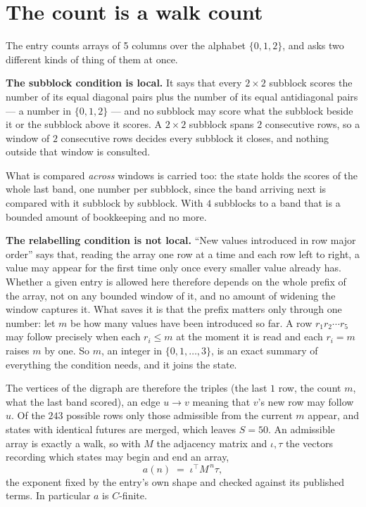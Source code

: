 \documentclass[11pt,a4paper]{article}
\theoremstyle{plain}
\theoremstyle{definition}
\begin{document}
\section{The count is a walk count}

The entry counts arrays of 5 columns over the alphabet $\{0,1,2\}$, and asks two different kinds of thing of them at once.

\textbf{The subblock condition is local.} It says that every $2\times2$ subblock scores the number of its equal diagonal pairs plus the number of its equal antidiagonal pairs --- a number in $\{0,1,2\}$ --- and no subblock may score what the subblock beside it or the subblock above it scores. A $ 2\times2$ subblock spans $2$ consecutive rows, so a window of $2$ consecutive rows decides every subblock it closes, and nothing outside that window is consulted.

What is compared \emph{across} windows is carried too: the state holds the scores of the whole last band, one number per subblock, since the band arriving next is compared with it subblock by subblock. With $4$ subblocks to a band that is a bounded amount of bookkeeping and no more.

\textbf{The relabelling condition is not local.} ``New values introduced in row major order'' says that, reading the array one row at a time and each row left to right, a value may appear for the first time only once every smaller value already has. Whether a given entry is allowed here therefore depends on the whole prefix of the array, not on any bounded window of it, and no amount of widening the window captures it. What saves it is that the prefix matters only through one number: let $m$ be how many values have been introduced so far. A row $r_1r_2\cdots r_5$ may follow precisely when each $r_i\le m$ at the moment it is read and each $r_i=m$ raises $m$ by one. So $m$, an integer in $\{0,1,\dots,3\}$, is an exact summary of everything the condition needs, and it joins the state.

The vertices of the digraph are therefore the triples (the last $1$ row, the count $m$, what the last band scored), an edge $u\to v$ meaning that $v$'s new row may follow $u$. Of the $243$ possible rows only those admissible from the current $m$ appear, and states with identical futures are merged, which leaves $S=50$. An admissible array is exactly a walk, so with $M$ the adjacency matrix and $\iota,\tau$ the vectors recording which states may begin and end an array,
\[
a(n)\;=\;\iota^{\!\top}M^{\,n}\tau ,
\]
the exponent fixed by the entry's own shape and checked against its published terms. In
particular $a$ is $C$-finite.
\end{document}
